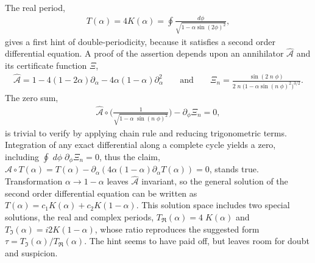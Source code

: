 \documentclass[nofootinbib,preprint]{revtex4-1}
\begin{document}
The real period,
\begin{eqnarray}
T(\alpha) = 4K(\alpha) = \oint \frac{d\phi}{\sqrt{1-\alpha\sin(2\phi)^2}},\nonumber
\end{eqnarray}
gives a first hint of double-periodicity, because it satisfies a second order differential 
equation. A proof of the assertion depends upon an annihilator $\widehat{\mathcal{A}}$ and its certificate 
function $\Xi$, 
\begin{eqnarray}
\widehat{\mathcal{A}}=1-4(1-2\alpha)\partial_{\alpha}-4\alpha(1-\alpha)\partial^2_{\alpha}  
 \;\;\;\;\;\;\; \text{and} \;\;\;\;\;\;\;
\Xi_n = \frac{\sin(2 \; n \; \phi)}{2\;n\;\big(1-\alpha \sin(n\;\phi)^2\big)^{3/2}}. \nonumber
\end{eqnarray}
The zero sum,
\begin{eqnarray}
\widehat{\mathcal{A}}\circ \bigg(\frac{1}{\sqrt{1-\alpha\;\sin(n\;\phi)^2}}\bigg) 
-\partial_{\phi}\Xi_n =0 \nonumber, 
\end{eqnarray}
is trivial to verify by applying chain rule and reducing trigonometric terms. 
Integration of any exact differential along a complete cycle yields a zero, 
including $\oint \; d\phi \; \partial_{\phi} \Xi_n=0$, thus the claim, 
$\widehat{\mathcal{A}}\circ T(\alpha)=T(\alpha)-\partial_{\alpha}(4\alpha(1-\alpha)\partial_{\alpha}T(\alpha))=0$, 
stands true. Transformation $\alpha \rightarrow 1-\alpha$ leaves $\widehat{\mathcal{A}}$ invariant, 
so the general solution of the second order differential equation can be written as 
$T(\alpha)=c_1 K(\alpha)+ c_2 K(1-\alpha)$. This solution space includes two special 
solutions, the real and complex periods, $T_{\mathfrak{R}}(\alpha)=4\;K(\alpha)$ and 
$T_{\mathfrak{I}}(\alpha)=i 2K(1-\alpha)$, whose ratio reproduces the suggested 
form $\tau=T_{\mathfrak{I}}(\alpha)/T_{\mathfrak{R}}(\alpha)$. 
The hint seems to have paid off, but leaves room for doubt and suspicion. 
\end{document}
